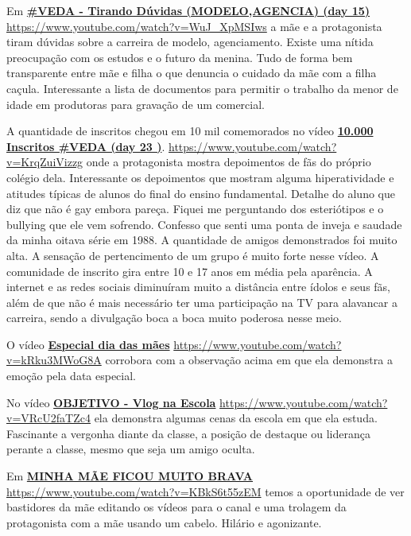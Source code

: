 Em \href{https://www.youtube.com/watch?v=WuJ_XpMSIws}{\textbf{\#VEDA - Tirando Dúvidas (MODELO,AGENCIA) (day 15)}} \url{https://www.youtube.com/watch?v=WuJ_XpMSIws} a mãe e a protagonista tiram dúvidas sobre a carreira de modelo, agenciamento. Existe uma nítida preocupação com os estudos e o futuro da menina. Tudo de forma bem transparente entre mãe e filha o que denuncia o cuidado da mãe com a filha caçula. Interessante a lista de documentos para permitir o trabalho da menor de idade em produtoras para gravação de um comercial.

A quantidade de inscritos chegou em 10 mil comemorados no vídeo \href{https://www.youtube.com/watch?v=KrqZuiVizzg}{\textbf{10.000 Inscritos \#VEDA (day 23 )}}. \url{https://www.youtube.com/watch?v=KrqZuiVizzg} onde a protagonista mostra depoimentos de fãs do próprio colégio dela. Interessante os depoimentos que mostram alguma hiperatividade e atitudes típicas de alunos do final do ensino fundamental. Detalhe do aluno que diz que não é gay embora pareça. Fiquei me perguntando dos esteriótipos e o bullying que ele vem sofrendo. Confesso que senti uma ponta de inveja e saudade da minha oitava série em 1988. A quantidade de amigos demonstrados foi muito alta. A sensação de pertencimento de um grupo é muito forte nesse vídeo. A comunidade de inscrito gira entre 10 e 17 anos em média pela aparência. A internet e as redes sociais diminuíram muito a distância entre ídolos e seus fãs, além de que não é mais necessário ter uma participação na TV para alavancar a carreira, sendo a divulgação boca a boca muito poderosa nesse meio.

O vídeo \href{https://www.youtube.com/watch?v=kRku3MWoG8A}{\textbf{Especial dia das mães}} \url{https://www.youtube.com/watch?v=kRku3MWoG8A} corrobora com a observação acima em que ela demonstra a emoção pela data especial.

No vídeo \href{https://www.youtube.com/watch?v=VRcU2faTZc4}{\textbf{OBJETIVO - Vlog na Escola}} \url{https://www.youtube.com/watch?v=VRcU2faTZc4} ela demonstra algumas cenas da escola em que ela estuda. Fascinante a vergonha diante da classe, a posição de destaque ou liderança perante a classe, mesmo que seja um amigo oculta.

Em \href{https://www.youtube.com/watch?v=KBkS6t55zEM}{\textbf{MINHA MÃE FICOU MUITO BRAVA }} \url{https://www.youtube.com/watch?v=KBkS6t55zEM} temos a oportunidade de ver bastidores da mãe editando os vídeos para o canal e uma trolagem da protagonista com a mãe usando um cabelo. Hilário e agonizante.

